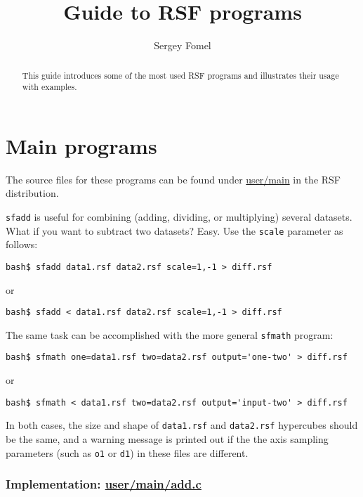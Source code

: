 \title{Guide to RSF programs}
\author{Sergey Fomel}

\maketitle

\begin{abstract}

This guide introduces some of the most used RSF programs and illustrates their
usage with examples.

\end{abstract}

\section{Main programs}

The source files for these programs can be found under
\href{http://rsf.svn.sourceforge.net/viewvc/rsf/trunk/user/main/}{user/main}
in the RSF distribution.

\noindent\doublebox{\parbox{\textwidth}{

}}

\texttt{sfadd} is useful for combining (adding, dividing, or
multiplying) several datasets. What if you want to subtract two
datasets? Easy. Use the \texttt{scale} parameter as follows:
\begin{verbatim}
bash$ sfadd data1.rsf data2.rsf scale=1,-1 > diff.rsf
\end{verbatim}
or
\begin{verbatim}
bash$ sfadd < data1.rsf data2.rsf scale=1,-1 > diff.rsf
\end{verbatim}
The same task can be accomplished with the more general \texttt{sfmath} program:
\begin{verbatim}
bash$ sfmath one=data1.rsf two=data2.rsf output='one-two' > diff.rsf
\end{verbatim}
or
\begin{verbatim}
bash$ sfmath < data1.rsf two=data2.rsf output='input-two' > diff.rsf
\end{verbatim}
In both cases, the size and shape of \texttt{data1.rsf} and
\texttt{data2.rsf} hypercubes should be the same, and a warning
message is printed out if the the axis sampling parameters (such as
\texttt{o1} or \texttt{d1}) in these files are different.

\subsubsection{Implementation: \href{http://rsf.svn.sourceforge.net/viewvc/rsf/trunk/user/main/add.c?view=markup}{user/main/add.c}}

